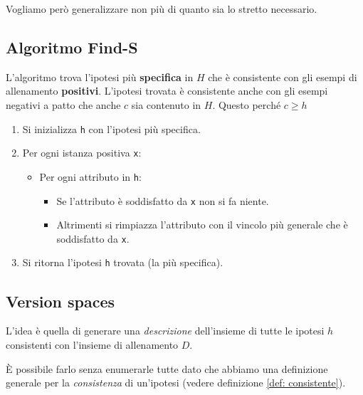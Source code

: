Vogliamo per\`o generalizzare non pi\`u di quanto sia lo stretto necessario.

\subsection{Algoritmo Find-S}
L'algoritmo trova l'ipotesi pi\`u \textbf{specifica} in $H$ che \`e consistente con gli esempi di allenamento
\textbf{positivi}. L'ipotesi trovata \`e consistente anche con gli esempi negativi a patto che anche $c$ sia
contenuto in $H$. Questo perch\'e $c \geq h$
\begin{enumerate}
	\item Si inizializza \verb|h| con l'ipotesi pi\`u specifica.
	\item Per ogni istanza positiva \verb|x|:
	      \begin{itemize}
		      \item Per ogni attributo in \verb|h|:
		            \begin{itemize}
			            \item Se l'attributo \`e soddisfatto da \verb|x| non si fa niente.
			            \item Altrimenti si rimpiazza l'attributo con il vincolo pi\`u generale che \`e soddisfatto da
			                  \verb|x|.
		            \end{itemize}
	      \end{itemize}
	\item Si ritorna l'ipotesi \verb|h| trovata (la pi\`u specifica).
\end{enumerate}

\subsection{Version spaces}
L'idea \`e quella di generare una \emph{descrizione} dell'insieme di tutte le ipotesi $h$ consistenti con l'insieme di
allenamento $D$.

\`E possibile farlo senza enumerarle tutte dato che abbiamo una definizione generale per la \emph{consistenza} di
un'ipotesi (vedere definizione \ref{def: consistente}).

